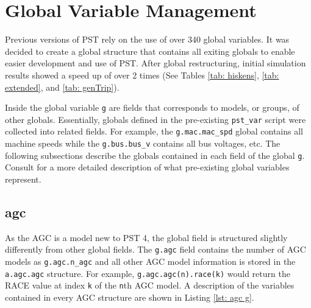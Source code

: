 \pagebreak
\section{Global Variable Management}  
Previous versions of PST rely on the use of over 340 global variables.
It was decided to create a global structure that contains all exiting globals to enable easier development and use of PST.
After global restructuring, initial simulation results showed a speed up of over 2 times (See Tables \ref{tab: hiskens}, \ref{tab: extended}, and \ref{tab: genTrip}).


Inside the global variable \verb|g| are fields that corresponds to models, or groups, of other globals.
Essentially, globals defined in the pre-existing \verb|pst_var| script were collected into related fields.
For example, the \verb|g.mac.mac_spd| global contains all machine speeds while the \verb|g.bus.bus_v| contains all bus voltages, etc.
The following subsections describe the globals contained in each field of the global \verb|g|. 
Consult \cite{PST3manual} for a more detailed description of what pre-existing global variables represent.

\pagebreak
\subsection{agc}  
As the AGC is a model new to PST 4, the global field is structured slightly differently from other global fields.
The \verb|g.agc| field contains the number of AGC models as \verb|g.agc.n_agc| and all other AGC model information is stored in the \verb|a.agc.agc| structure.
For example, \verb|g.agc.agc(n).race(k)| would return the RACE value at index \verb|k| of the \verb|n|th AGC model.
A description of the variables contained in every AGC structure are shown in Listing \ref{lst: agc g}.

